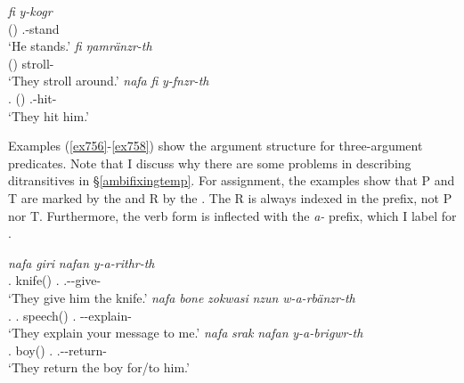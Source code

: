 \begin{exe}
\ex
\label{ex751}
\begin{xlist}
	\ex %
	\gll \emph{fi} \emph{y-kogr}\\
	\Third(\Abs) \Tsg.\Masc-stand\\
	\trans `He stands.'
	\label{ex752}
	\ex %
	\gll \emph{fi} \emph{ŋamränzr-th}\\
	\Third(\Abs) stroll-\Tpl\\
	\trans `They stroll around.'
	\label{ex753}
	\ex %
	\gll \emph{nafa} \emph{fi} \emph{y-fnzr-th}\\
	\Tpl{}.{\Erg} \Third(\Abs) \Tsg.\Masc-hit-\Tpl{}\\
	\trans `They hit him.'
	\label{ex754}
\end{xlist}
\end{exe}

Examples (\ref{ex756}-\ref{ex758}) show the argument structure for three-argument predicates. Note that I discuss why there are some problems in describing ditransitives in \S\ref{ambifixingtemp}. For  assignment, the examples show that P and T are marked by the   and R by the  . The R is always indexed in the prefix, not P nor T. Furthermore, the verb form is inflected with the \emph{a-} prefix, which I label {\Vc} for .

\begin{exe}
\ex
\label{ex755}
\begin{xlist}
	\ex %
	\gll \emph{nafa} \emph{giri} \emph{nafan} \emph{y-a-rithr-th}\\
	\Tpl{}.{\Erg} knife(\Abs) \Tsg.{\Dat} \Tsg.\Masc-\Vc-give-\Tpl{}\\
	\trans `They give him the knife.'
	\label{ex756}
	\ex %
	\gll \emph{nafa} \emph{bone} \emph{zokwasi} \emph{nzun} \emph{w-a-rbänzr-th}\\
	\Tpl{}.{\Erg} \Ssg.{\Poss} speech(\Abs) \Fsg.{\Dat} \Fsg-\Vc-explain-\Tpl{}\\
	\trans `They explain your message to me.'
	\label{ex757}
	\ex %
	\gll \emph{nafa} \emph{srak} \emph{nafan} \emph{y-a-brigwr-th}\\
	\Tpl{}.{\Erg} boy(\Abs) \Tsg.{\Dat} \Tsg.\Masc-\Vc-return-\Tpl{}\\
	\trans `They return the boy for/to him.'
	\label{ex758}
\end{xlist}
\end{exe}

